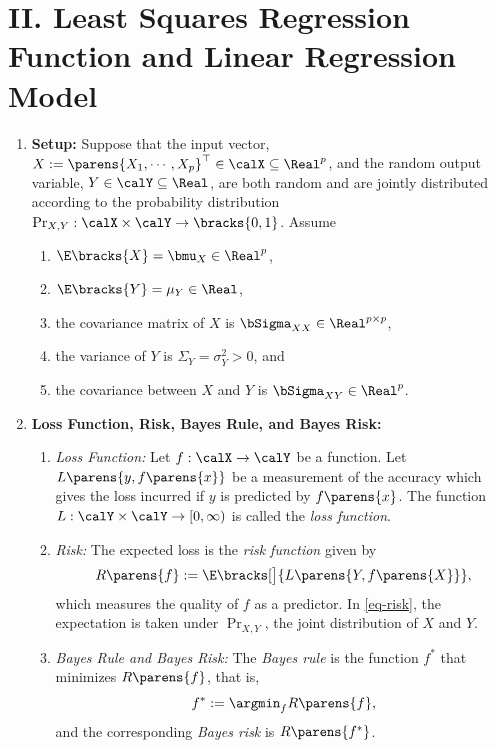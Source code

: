 \documentclass[12pt]{article}
\begin{document}
\section*{II. Least Squares Regression Function and Linear Regression Model}

\begin{enumerate}[label=\textbf{\arabic*.}]

	\item \textbf{Setup:} Suppose that the input vector, $X := \parens{X_1, \cdots, X_p}^\top \in \calX \subseteq \Real^p$, and the random output variable, $Y \in \calY \subseteq \Real$, are both random and are jointly distributed according to the probability distribution $\Pr_{X, Y}: \calX \times \calY \to \bracks{0, 1}$. Assume 
	\begin{enumerate}
		\item $\E \bracks{X} = \bmu_X \in \Real^p$, 
		\item $\E \bracks{Y} = \mu_Y \in \Real$, 
		\item the covariance matrix of $X$ is $\bSigma_{XX} \in \Real^{p \times p}$, 
		\item the variance of $Y$ is $\Sigma_Y = \sigma_Y^2 > 0$, and 
		\item the covariance between $X$ and $Y$ is $\bSigma_{XY} \in \Real^p$. 
	\end{enumerate}
	
	\item \textbf{Loss Function, Risk, Bayes Rule, and Bayes Risk:} 
	\begin{enumerate}
		\item \textit{Loss Function:} Let $f: \calX \to \calY$ be a function. Let $L \parens{y, f \parens{x}}$ be a measurement of the accuracy which gives the loss incurred if $y$ is predicted by $f \parens{x}$. The function $L: \calY \times \calY \to [0, \infty)$ is called the \emph{loss function}. 
		\item \textit{Risk:} The expected loss is the \textit{risk function} given by 
		\begin{align}\label{eq-risk}
			R \parens{f} := \E \bracks[\big]{L \parens{Y, f \parens{X}}}, 
		\end{align}
		which measures the quality of $f$ as a predictor. In \eqref{eq-risk}, the expectation is taken under $\Pr_{X, Y}$, the joint distribution of $X$ and $Y$. 
		
		\item \textit{Bayes Rule and Bayes Risk:} The \textit{Bayes rule} is the function $f^*$ that minimizes $R \parens{f}$, that is, 
		\begin{align*}
			f^* := \argmin_f R \parens{f}, 
		\end{align*}
		and the corresponding \textit{Bayes risk} is $R \parens{f^*}$. 
	\end{enumerate}
	

\end{enumerate}
\end{document}

